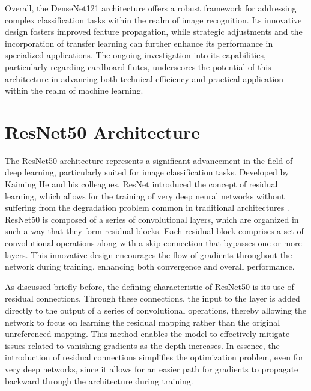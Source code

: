 Overall, the DenseNet121 architecture offers a robust framework for addressing complex classification tasks within the realm of image recognition. Its innovative design fosters improved feature propagation, while strategic adjustments and the incorporation of transfer learning can further enhance its performance in specialized applications. The ongoing investigation into its capabilities, particularly regarding cardboard flutes, underscores the potential of this architecture in advancing both technical efficiency and practical application within the realm of machine learning.

\section{ResNet50 Architecture}

The ResNet50 architecture represents a significant advancement in the field of deep learning, particularly suited for image classification tasks. Developed by Kaiming He and his colleagues, ResNet introduced the concept of residual learning, which allows for the training of very deep neural networks without suffering from the degradation problem common in traditional architectures \cite{He2016}. ResNet50 is composed of a series of convolutional layers, which are organized in such a way that they form residual blocks. Each residual block comprises a set of convolutional operations along with a skip connection that bypasses one or more layers. This innovative design encourages the flow of gradients throughout the network during training, enhancing both convergence and overall performance.



As discussed briefly before, the defining characteristic of ResNet50 is its use of residual connections. Through these connections, the input to the layer is added directly to the output of a series of convolutional operations, thereby allowing the network to focus on learning the residual mapping rather than the original unreferenced mapping. This method enables the model to effectively mitigate issues related to vanishing gradients as the depth increases. In essence, the introduction of residual connections simplifies the optimization problem, even for very deep networks, since it allows for an easier path for gradients to propagate backward through the architecture during training.


